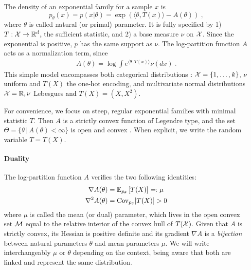 \documentclass[twoside]{article}
\newcommand*{\expect}[2][]{\ensuremath{\mathbb{E}_{#1} \left[ #2 \right] }} %
\newcommand{\cond}{\,\vert\,}
\newcommand{\logpart}{A}
\newcommand{\nat}{\theta}
\newcommand{\m}{\mu}
\newcommand{\meanp}{\m}
\begin{document}
The density of an exponential family for a sample $x$ is
\begin{equation}
	 p_\nat(x) = p(x|\nat) = \exp( \langle \nat, T(x) \rangle - \logpart(\nat)) \; ,
	 \label{eq:def_expfamily}
\end{equation}
where  $\nat$ is called natural (or primal) parameter.
It is fully specified by 1) $T: {\mathcal X} \rightarrow \mathbb{R}^d$, the sufficient statistic,
and 2) a base measure $\nu$ on ${\mathcal X}$.
Since the exponential is positive, $p$ has the same support as $\nu$.
The log-partition function $\logpart$ acts as a normalization term, since
\begin{align}
    \logpart(\nat) = \log \int e^{\langle \nat, T(x) \rangle} \nu(dx) \;.
\end{align}
This simple model encompasses both categorical distributions : ${\mathcal X} = \{1, \dots, k\}$, $\nu$ uniform and $T(X)$  the one-hot encoding, and multivariate normal distributions ${\mathcal X}=\mathbb{R}, \nu$ Lebesgues and $T(X)=(X, X^2)$.

For convenience, we focus on steep, regular exponential families with minimal statistic $T$.
Then $\logpart$ is a strictly convex function of Legendre type,
and the set $\Theta = \{ \nat \cond \logpart(\nat) < \infty\}$ is open and convex
\citep{barndoffnielsen2014information}.
When explicit, we write the random variable $T = T(X)$.


\paragraph{Duality}
The log-partition function $\logpart$ verifies the two following identities:
\begin{align}
    \nabla\logpart(\nat) &=  \expect[p_\nat]{T(X)} =: \meanp \\
    \nabla^2 \logpart(\nat) &= \Cov_{p_\nat}[T(X)] > 0
\end{align}
where $\meanp$ is called the mean (or dual) parameter, which lives in the open convex set ${\mathcal M}$ equal to the relative interior of the convex hull of $T({\mathcal X})$.
Given that $\logpart$ is strictly convex, its Hessian is positive definite and its gradient $\nabla \logpart$ is a \textit{bijection} between natural parameters $\nat$ and mean parameters $\m$.
We will write interchangeably $\m$ or  $\nat$ depending on the context, being aware that both are linked and represent the same distribution.
\end{document}
